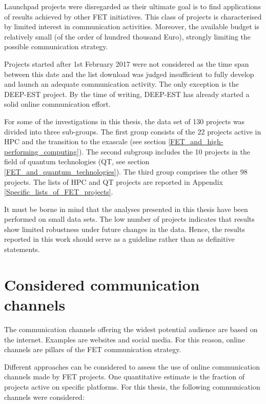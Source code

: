 Launchpad projects were disregarded as their ultimate goal is to find applications of results achieved by other FET initiatives. This class of projects is characterised by limited interest in communication activities. Moreover, the available budget is relatively small (of the order of hundred thousand Euro), strongly limiting the possible communication strategy. 

Projects started after 1st February 2017 were not considered as the time span between this date and the list download was judged insufficient to fully develop and launch an adequate communication activity. The only exception is the DEEP-EST project. By the time of writing, DEEP-EST has already started a solid online communication effort.    

For some of the investigations in this thesis, the data set of 130 projects was divided into three sub-groups.  The first group consists of the 22 projects active in HPC and the transition to the exascale (see section \ref{FET_and_high-performing_computing}). The second subgroup includes the 10 projects in the field of quantum technologies (QT, see section \ref{FET_and_quantum_technologies}). The third group comprises the other 98 projects. The lists of HPC and QT projects are reported in Appendix \ref{Specific_lists_of_FET_projects}.

It must be borne in mind that the analyses presented in this thesis have been performed on small data sets. The low number of projects indicates that results show limited robustness under future changes in the data. Hence, the results reported in this work should serve as a guideline rather than as definitive statements.  

\section{Considered communication channels} \label{Considered_channels}
The communication channels offering the widest potential audience are based on the internet. Examples are websites and social media. For this reason, online channels are pillars of the FET communication strategy. 

Different approaches can be considered to assess the use of online communication channels made by FET projects. One quantitative estimate is the fraction of projects active on specific platforms. For this thesis, the following communication channels were considered:   

